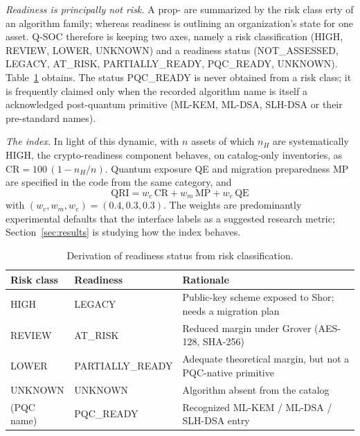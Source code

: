 \documentclass[conference]{IEEEtran}
\begin{document}
\emph{Readiness is principally not risk.} A prop- are summarized by the risk class erty of an algorithm family; whereas readiness is outlining an organization's state for one asset. Q-SOC therefore is keeping two axes, namely a risk classification (HIGH, REVIEW, LOWER, UNKNOWN) and a readiness status (NOT\_ASSESSED, LEGACY, AT\_RISK, PARTIALLY\_READY, PQC\_READY, UNKNOWN). Table~\ref{tab:readiness} obtains. The status PQC\_READY is never obtained from a risk class; it is frequently claimed only when the recorded algorithm name is itself a acknowledged post-quantum primitive (ML-KEM, ML-DSA, SLH-DSA or their pre-standard names).

\emph{The index.} In light of this dynamic, with $n$ assets of which $n_H$ are systematically HIGH, the crypto-readiness component behaves, on catalog-only inventories, as $\mathrm{CR}=100\,(1-n_H/n)$. Quantum exposure QE and migration preparedness MP are specified in the code from the same category, and
\begin{equation}
\mathrm{QRI} = w_c\,\mathrm{CR} + w_m\,\mathrm{MP} + w_e\,\mathrm{QE}
\label{eq:qri}
\end{equation}
with $(w_c,w_m,w_e)=(0.4,0.3,0.3)$. The weights are predominantly experimental defaults that the interface labels as a suggested research metric; Section~\ref{sec:results} is studying how the index behaves.

\begin{table}[t]
\caption{Derivation of readiness status from risk classification.}
\label{tab:readiness}
\centering
\footnotesize
\begin{tabular}{@{}l l p{3.2cm}@{}}
\toprule
Risk class & Readiness & Rationale \\
\midrule
HIGH & LEGACY & Public-key scheme exposed to Shor; needs a migration plan \\
REVIEW & AT\_RISK & Reduced margin under Grover (AES-128, SHA-256) \\
LOWER & PARTIALLY\_READY & Adequate theoretical margin, but not a PQC-native primitive \\
UNKNOWN & UNKNOWN & Algorithm absent from the catalog \\
(PQC name) & PQC\_READY & Recognized ML-KEM / ML-DSA / SLH-DSA entry \\
\bottomrule
\end{tabular}
\end{table}
\end{document}
